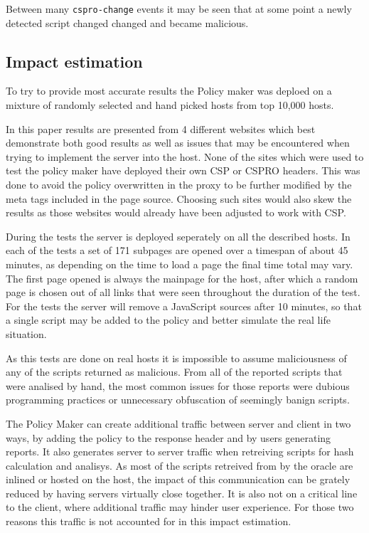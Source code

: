 \begin{description}
Between many \texttt{cspro-change} events it may be seen that at some point a newly detected script changed changed and became malicious.

\subsection{Impact estimation}

To try to provide most accurate results the Policy maker was deploed on a mixture of randomly selected and hand picked hosts from top 10,000 hosts.

In this paper results are presented from 4 different websites which best demonstrate both good results as well as issues that may be encountered when trying to implement the server into the host.
None of the sites which were used to test the policy maker have deployed their own CSP or CSPRO headers.
This was done to avoid the policy overwritten in the proxy to be further modified by the meta tags included in the page source.
Choosing such sites would also skew the results as those websites would already have been adjusted to work with CSP.

During the tests the server is deployed seperately on all the described hosts.
In each of the tests a set of 171 subpages are opened over a timespan of about 45 minutes, as depending on the time to load a page the final time total may vary. 
The first page opened is always the mainpage for the host, after which a random page is chosen out of all links that were seen throughout the duration of the test.
For the tests the server will remove a JavaScript sources after 10 minutes, so that a single script may be added to the policy and better simulate the real life situation.

As this tests are done on real hosts it is impossible to assume maliciousness of any of the scripts returned as malicious.
From all of the reported scripts that were analised by hand, the most common issues for those reports were dubious programming practices or unnecessary obfuscation of seemingly banign scripts.

The Policy Maker can create additional traffic between server and client in two ways, by adding the policy to the response header and by users generating reports.
It also generates server to server traffic when retreiving scripts for hash calculation and analisys.
As most of the scripts retreived from by the oracle are inlined or hosted on the host, the impact of this communication can be grately reduced by having servers virtually close together.
It is also not on a critical line to the client, where additional traffic may hinder user experience.
For those two reasons this traffic is not accounted for in this impact estimation.


\end{description}
